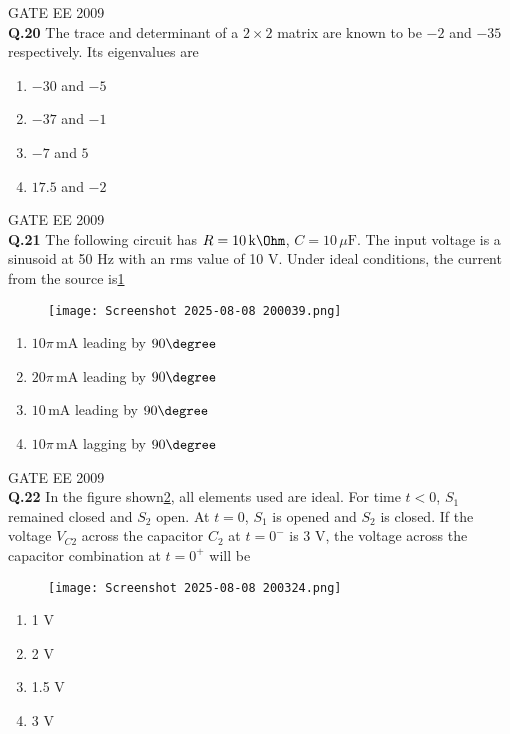 \documentclass[12pt]{article}
\begin{document}
\vspace{0.5cm}
\hspace{10pt}
GATE EE 2009\\
\noindent\textbf{Q.20} The trace and determinant of a $2 \times 2$ matrix are known to be $-2$ and $-35$ respectively. Its eigenvalues are

\begin{enumerate}
     \item  $-30$ and $-5$
     \item  $-37$ and $-1$
     \item $-7$ and $5$
     \item $17.5$ and $-2$
\end{enumerate}

\vspace{1cm}

\hspace{10pt}
GATE EE 2009\\



\noindent\textbf{Q.21} The following circuit has $R = 10\,\text{k} \Ohm$, $C = 10\,\mu\text{F}$. The input voltage is a sinusoid at 50 Hz with an rms value of 10 V. Under ideal conditions, the current from the source is\ref{fig:6}
\begin{figure}[h]
\hfill
    \texttt{[image: Screenshot 2025-08-08 200039.png]}
    \label{fig:6}
\end{figure}
\begin{enumerate}
    \item $10 \pi\,\text{mA}$ leading by $90\degree$
    \item $20 \pi\,\text{mA}$ leading by $90\degree$
    \item $10\,\text{mA}$ leading by $90\degree$
    \item $10 \pi\,\text{mA}$ lagging by $90\degree$
\end{enumerate}

\vspace{0.5cm}
\hspace{10pt}
GATE EE 2009\\
\noindent\textbf{Q.22} In the figure shown\ref{fig:7}, all elements used are ideal. For time $t < 0$, $S_1$ remained closed and $S_2$ open. At $t=0$, $S_1$ is opened and $S_2$ is closed. If the voltage $V_{C2}$ across the capacitor $C_2$ at $t=0^{-}$ is 3 V, the voltage across the capacitor combination at $t=0^{+}$ will be
\begin{figure}[h!]
    \centering
    \texttt{[image: Screenshot 2025-08-08 200324.png]}
    \label{fig:7}
\end{figure}
\begin{enumerate}
    \item 1 V
    \item 2 V
    \item 1.5 V
    \item 3 V
\end{enumerate}
\end{document}

